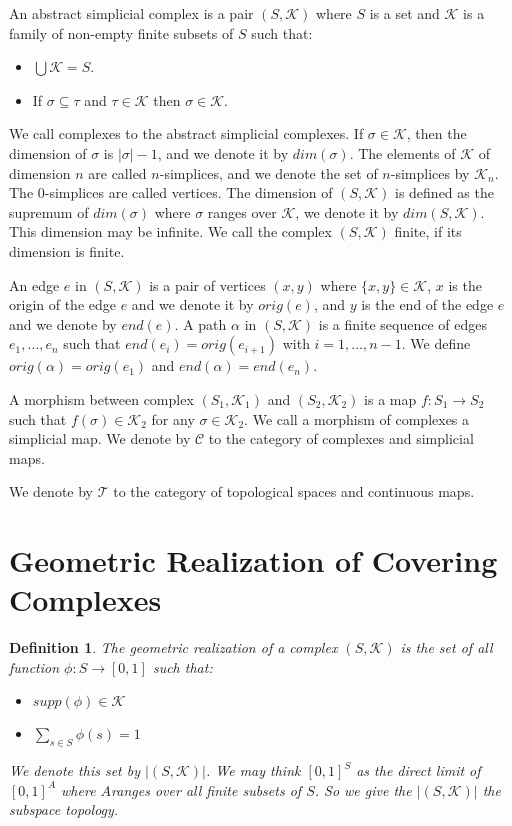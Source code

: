 \documentclass{amsart}
\newtheorem{definition}{Definition}[section]
\begin{document}
An abstract simplicial complex is a pair $(S,\mathcal{K})$ where $S$ is a set and $\mathcal{K}$ is a family of non-empty finite subsets of $S$ such that:
\begin{itemize}
\item $\bigcup\mathcal{K}=S$.
\item If $\sigma\subseteq \tau$ and $\tau\in \mathcal{K}$ then $\sigma\in\mathcal{K}$.
\end{itemize}
We call complexes to the abstract simplicial complexes.  If $\sigma\in \mathcal{K}$, then the dimension of $\sigma$ is $\vert\sigma\vert-1$, and we denote it by $dim(\sigma)$. The elements of $\mathcal{K}$ of dimension $n$ are called $n$-simplices, and we denote the set of $n$-simplices by $\mathcal{K}_n$. The $0$-simplices are called vertices. The dimension of $(S,\mathcal{K})$ is defined as the supremum of $dim(\sigma)$ where $\sigma$ ranges over $\mathcal{K}$, we denote it by $dim(S,\mathcal{K})$. This dimension may be infinite. We call the complex $(S,\mathcal{K})$  finite, if its dimension is finite.

An edge $e$ in $(S,\mathcal{K})$ is a pair of vertices  $(x,y)$ where $\{x,y\}\in\mathcal{K}$, $x$ is the origin of the edge $e$ and we denote it by $orig(e)$, and $y$ is the end of the edge $e$ and we denote by $end(e)$. A path $\alpha$ in $(S,\mathcal{K})$ is a finite sequence of edges $e_1,\dots,e_n$ such that $end(e_i)=orig(e_{i+1})$ with $i=1,\dots,n-1$. We define $orig(\alpha)=orig(e_1)$ and $end(\alpha)=end(e_n)$. 

A morphism between complex $(S_1,\mathcal{K}_1)$ and $(S_2,\mathcal{K}_2)$ is a map $f\colon S_1\longrightarrow S_2$ such that $f(\sigma)\in \mathcal{K}_2$ for any $\sigma\in\mathcal{K}_2$. We call a morphism of complexes a simplicial map. We  denote by $\mathcal{C}$ to the category of complexes and simplicial maps.

We  denote by $\mathcal{T}$ to the category of topological spaces and continuous maps.

\section{Geometric Realization of Covering Complexes}

\begin{definition}
The geometric realization of a complex $(S,\mathcal{K})$ is the set of all function $\phi\colon S\longrightarrow [0,1]$ such that:
\begin{itemize}
\item $supp(\phi)\in\mathcal{K}$
\item $\sum_{s\in S}\phi(s)=1$
\end{itemize}
We denote this set by $\vert (S,\mathcal{K})\vert$. We may think $[0,1]^S$ as the direct limit of $[0,1]^A$ where $A$ranges over all finite subsets of $S$. So we give the $\vert (S,\mathcal{K})\vert$ the subspace topology.
\end{definition}
\end{document}
